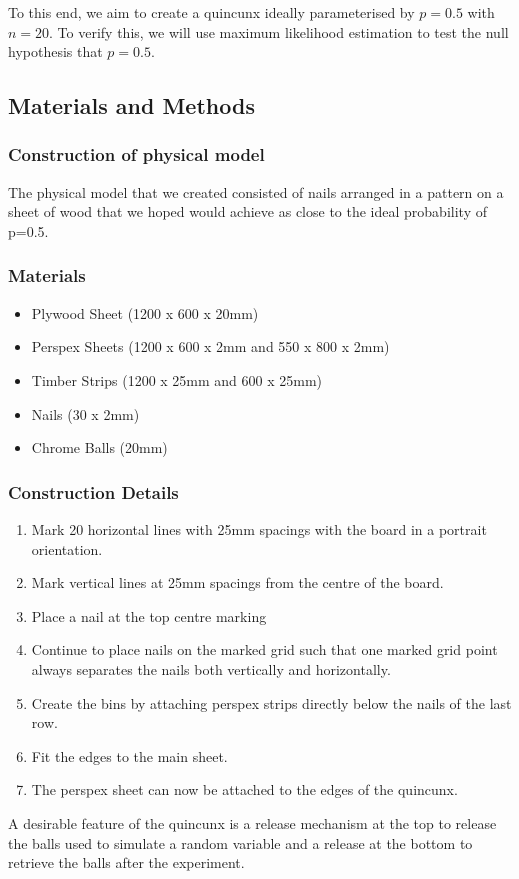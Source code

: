 To this end, we aim to create a quincunx ideally parameterised by $p=0.5$ with $n=20$. To verify this, we will use maximum likelihood estimation to test the null hypothesis that $p=0.5$.

\subsection{Materials and Methods}
\subsubsection*{Construction of physical model}
The physical model that we created consisted of nails arranged in a pattern on a sheet of wood that we hoped would achieve as close to the ideal probability of p=0.5.

\subsubsection*{Materials}
\begin{itemize}
    \item Plywood Sheet (1200 x 600 x 20mm)
\item Perspex Sheets (1200 x 600 x 2mm and 550 x 800 x 2mm)
\item Timber Strips (1200 x 25mm and 600 x 25mm)
\item Nails (30 x 2mm)
\item Chrome Balls (20mm)
\end{itemize}


\subsubsection*{Construction Details}
\begin{enumerate}
    \item Mark 20 horizontal lines with 25mm spacings with the board in a portrait orientation.
\item Mark vertical lines at 25mm spacings from the centre of the board.
\item Place a nail at the top centre marking
\item Continue to place nails on the marked grid such that one marked grid point always separates the nails both vertically and horizontally.
\item Create the bins by attaching perspex strips directly below the nails of the last row.
\item Fit the edges to the main sheet. 
\item The perspex sheet can now be attached to the edges of the quincunx.
\end{enumerate}
 A desirable feature of the quincunx is a release mechanism at the top to release the balls used to simulate a random variable and a release at the bottom to retrieve the balls after the experiment.

